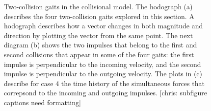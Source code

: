 \begin{figure}[h]		%
\begin{centering}
\end{centering}
\caption[Diagram and Figure: Two-Collision Gaits in the Collisional Model]{Two-collision gaits in the collisional model. The hodograph (a) describes the four two-collision gaits explored in this section. A hodograph describes how a vector changes in both magnitude and direction by plotting the vector from the same point. The next diagram (b) shows the two impulses that belong to the first and second collisions that appear in some of the four gaits: the first impulse is perpendicular to the incoming velocity, and the second impulse is perpendicular to the outgoing velocity. The plots in (c) describe for case 4 the time history of the simultaneous forces that correpsond to the incoming and outgoing impulses. [chris: subfigure captions need formatting]}
\label{fig:Ncollisional}
\end{figure}
%

